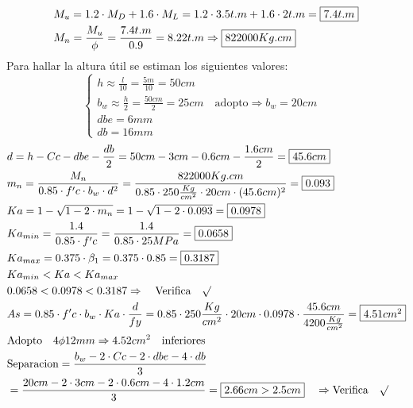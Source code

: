 \begin{enumerate}
\begin{itemize}
\begin{align*}
& M_u = 1.2 \cdot M_D + 1.6 \cdot M_L = 1.2 \cdot 3.5 t.m + 1.6 \cdot 2 t.m = \framebox{$7.4 t.m$}\\
& M_n = \frac{M_u}{\phi} = \frac{7.4 t.m}{0.9} = 8.22 t.m \Rightarrow \framebox{$822000 Kg.cm$}
\end{align*}
Para hallar la altura útil se estiman los siguientes valores:\\
\[\left\{ \begin{array}{ll}
         h \approx \frac{l}{10} = \frac{5m}{10} = 50 cm & \\
         b_w \approx \frac{h}{2} = \frac{50 cm }{2} = 25 cm \quad \text{adopto} \Rightarrow b_w = 20 cm &\\
         dbe = 6 mm &\\
         db = 16 mm & \end{array} \right. \]
\begin{align*}
& d = h - Cc - dbe - \frac{db}{2} = 50cm - 3cm -0.6cm -\frac{1.6cm}{2} = \framebox{$45.6cm$}\\
& m_n = \frac{M_n}{0.85 \cdot f'c \cdot b_w \cdot d^2} = \frac{822000 Kg.cm}{0.85 \cdot 250 \frac{Kg}{cm^2} \cdot 20 cm \cdot (45.6cm)^2} = \framebox{0.093}\\
& Ka = 1- \sqrt{1-2 \cdot m_n} = 1- \sqrt{1-2 \cdot 0.093} = \framebox{0.0978}\\
& Ka_{min}= \frac{1.4}{0.85 \cdot f'c} = \frac{1.4}{0.85 \cdot 25MPa} = \framebox{0.0658}\\
& Ka_{max}= 0.375 \cdot \beta_1 = 0.375 \cdot 0.85 = \framebox{0.3187}\\
& Ka_{min} < Ka < Ka_{max}\\
& 0.0658 < 0.0978 < 0.3187 \Rightarrow \quad \text{Verifica} \quad \surd\\
& As= 0.85 \cdot f'c \cdot b_w \cdot Ka \cdot \frac{d}{fy} = 0.85 \cdot 250 \frac{Kg}{cm^2} \cdot 20cm \cdot 0.0978 \cdot \frac{45.6cm}{4200 \frac{Kg}{cm^2}} = \framebox{$4.51 cm^2$}\\
& \text{Adopto} \quad 4 \phi 12mm \Rightarrow 4.52cm^2 \quad \text{inferiores}\\
& \text{Separacion} = \frac{b_w-2 \cdot Cc - 2 \cdot dbe - 4 \cdot db}{3} \\ 
& = \frac{20cm-2 \cdot 3cm - 2 \cdot 0.6cm - 4 \cdot 1.2cm}{3} = \framebox{$2.66cm > 2.5 cm$} \quad \Rightarrow \text{Verifica} \quad \surd
\end{align*}


\end{itemize}
\end{enumerate}

